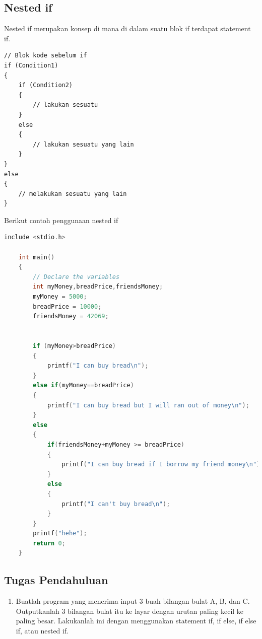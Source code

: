 \subsection{Nested if}
Nested if merupakan konsep di mana di dalam suatu blok if terdapat statement if.
\begin{verbatim}
// Blok kode sebelum if
if (Condition1) 
{
    if (Condition2)
    {
        // lakukan sesuatu
    }
    else
    {
        // lakukan sesuatu yang lain
    }
} 
else
{
    // melakukan sesuatu yang lain
}
\end{verbatim}

Berikut contoh penggunaan nested if

\begin{lstlisting}[language=c,caption = Contoh nested if,label=lst:nestedifexample01]
	include <stdio.h>
	
	int main()
	{
		// Declare the variables
		int myMoney,breadPrice,friendsMoney;
		myMoney = 5000;
		breadPrice = 10000;
		friendsMoney = 42069;
		
		
		if (myMoney>breadPrice)
		{
		    printf("I can buy bread\n");
		}
		else if(myMoney==breadPrice)
		{
		    printf("I can buy bread but I will ran out of money\n");
		}
		else
		{
		    if(friendsMoney+myMoney >= breadPrice)
		    {
		        printf("I can buy bread if I borrow my friend money\n"); 
		    }
		    else
		    {
	            printf("I can't buy bread\n");	
		    }
		}
		printf("hehe");
		return 0;
	}
\end{lstlisting}


\subsection{Tugas Pendahuluan}
\begin{enumerate}
	\item Buatlah program yang menerima input 3 buah bilangan bulat A, B, dan C. Outputkanlah 3 bilangan bulat itu ke layar dengan urutan paling kecil ke paling besar. Lakukanlah ini dengan menggunakan statement if, if else, if else if, atau nested if.
\end{enumerate}

